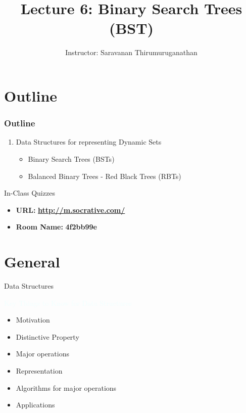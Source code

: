 \documentclass{beamer}
\title[Saravanan Thirumuruganathan] 
{Lecture 6: Binary Search Trees (BST)}
\author[CSE 5311] 
{Instructor: Saravanan Thirumuruganathan}
\date[]
\newcommand{\tblue}[1]{{\Large {\textcolor{azure}{#1}}}}
\begin{document}
\begin{frame}
  \titlepage
\end{frame}


\section{Outline}

\begin{frame}
\frametitle {Outline}
\begin{enumerate}
\item Data Structures for representing Dynamic Sets
\begin{itemize}
    \item Binary Search Trees (BSTs)
    \item Balanced Binary Trees - Red Black Trees (RBTs)
\end{itemize}
\end{enumerate}
\end{frame}

\begin{frame}{In-Class Quizzes}
\begin{itemize}
\item {\Large {\bf URL:}} {\LARGE \bf \url{http://m.socrative.com/}} 
\item {\Large {\bf Room Name:} {\LARGE \bf 4f2bb99e}}
\end{itemize}
\end{frame}

\section{General}

\begin{frame}{Data Structures}

\tblue{Key Things to Know for Data Structures}
\begin{itemize}
    \item Motivation
    \item Distinctive Property
    \item Major operations
    \item Representation
    \item Algorithms for major operations
    \item Applications
\end{itemize}
\end{frame}
\end{document}
